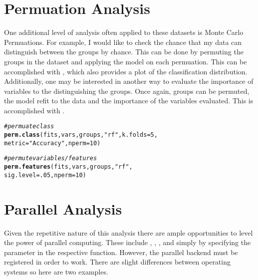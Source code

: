\documentclass[12pt]{article}\usepackage[]{graphicx}\usepackage[usenames,dvipsnames]{color}
\makeatletter
\newcommand{\hlnum}[1]{\textcolor[rgb]{0.686,0.059,0.569}{#1}}%
\newcommand{\hlstr}[1]{\textcolor[rgb]{0.192,0.494,0.8}{#1}}%
\newcommand{\hlcom}[1]{\textcolor[rgb]{0.678,0.584,0.686}{\textit{#1}}}%
\newcommand{\hlstd}[1]{\textcolor[rgb]{0.345,0.345,0.345}{#1}}%
\newcommand{\hlkwc}[1]{\textcolor[rgb]{0.333,0.667,0.333}{#1}}%
\newcommand{\hlkwd}[1]{\textcolor[rgb]{0.737,0.353,0.396}{\textbf{#1}}}%
\newenvironment{kframe}{%
 \def\at@end@of@kframe{}%
 \ifinner\ifhmode%
  \def\at@end@of@kframe{\end{minipage}}%
  \begin{minipage}{\columnwidth}%
 \fi\fi%
 \def\FrameCommand##1{\hskip\@totalleftmargin \hskip-\fboxsep
 \colorbox{shadecolor}{##1}\hskip-\fboxsep
     \hskip-\linewidth \hskip-\@totalleftmargin \hskip\columnwidth}%
 \MakeFramed {\advance\hsize-\width
   \@totalleftmargin\z@ \linewidth\hsize
   \@setminipage}}%
 {\par\unskip\endMakeFramed%
 \at@end@of@kframe}
\newenvironment{knitrout}{}{} %
\makeatother
\begin{document}
\section{Permuation Analysis}

One additional level of analysis often applied to these datasets is Monte
Carlo Permuations.  For example, I would like to check the chance that
my data can distinguish between the groups by chance.  This can be done by
permuting the groups in the dataset and applying the model on each permuation.
This can be accomplished with , which also provides a 
plot of the classification distribution.  Additionally, one may
be interested in another way to evaluate the importance of variables to the 
distinguishing the groups.  Once again, groups can be permuted, the model
refit to the data and the importance of the variables evaluated.  This is
accomplished with .

\begin{knitrout}
\color{fgcolor}\begin{kframe}
\begin{alltt}
\hlcom{# permuate class}
\hlkwd{perm.class}\hlstd{(fits, vars, groups,} \hlstr{"rf"}\hlstd{,} \hlkwc{k.folds}\hlstd{=}\hlnum{5}\hlstd{,}
           \hlkwc{metric}\hlstd{=}\hlstr{"Accuracy"}\hlstd{,} \hlkwc{nperm}\hlstd{=}\hlnum{10}\hlstd{)}


\hlcom{# permute variables/features}
\hlkwd{perm.features}\hlstd{(fits, vars, groups,} \hlstr{"rf"}\hlstd{,}
        \hlkwc{sig.level} \hlstd{=} \hlnum{.05}\hlstd{,} \hlkwc{nperm} \hlstd{=} \hlnum{10}\hlstd{)}
\end{alltt}
\end{kframe}
\end{knitrout}

\newpage
\section{Parallel Analysis}

Given the repetitive nature of this analysis there are ample opportunities to
level the power of parallel computing.  These include ,
, , and 
 simply by specifying the parameter 
 in the respective function. However, the parallel
backend must be registered in order to work. There are slight differences 
between operating systems so here are two examples.
\end{document}
